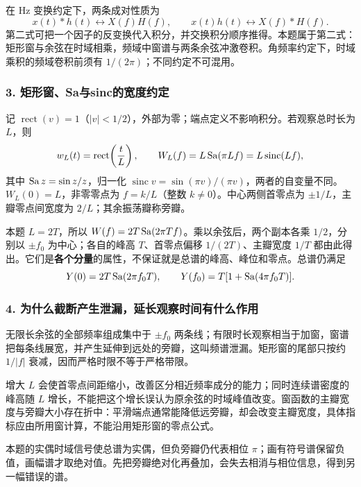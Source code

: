 在 Hz 变换约定下，两条成对性质为
\[
x(t)*h(t)\longleftrightarrow X(f)H(f),\qquad
x(t)h(t)\longleftrightarrow X(f)*H(f).
\]
第二式可把一个因子的反变换代入积分，并交换积分顺序推得。本题属于第二式：矩形窗与余弦在时域相乘，频域中窗谱与两条余弦冲激卷积。角频率约定下，时域乘积的频域卷积前须有 $1/(2\pi)$；不同约定不可混用。

\subsubsection*{3. 矩形窗、Sa与sinc的宽度约定}
记 $\operatorname{rect}(v)=1$（$|v|<1/2$），外部为零；端点定义不影响积分。若观察总时长为 $L$，则
\[
w_L(t)=\operatorname{rect}\!\left(\frac tL\right),\qquad
W_L(f)=L\operatorname{Sa}(\pi Lf)=L\operatorname{sinc}(Lf),
\]
其中 $\operatorname{Sa} z=\sin z/z$，归一化 $\operatorname{sinc}v=\sin(\pi v)/(\pi v)$，两者的自变量不同。$W_L(0)=L$，非零零点为 $f=k/L$（整数 $k\ne0$）。中心两侧首零点为 $\pm1/L$，主瓣零点间宽度为 $2/L$；其余振荡瓣称旁瓣。

本题 $L=2T$，所以 $W(f)=2T\operatorname{Sa}(2\pi Tf)$。乘以余弦后，两个副本各乘 $1/2$，分别以 $\pm f_0$ 为中心；各自的峰高 $T$、首零点偏移 $1/(2T)$、主瓣宽度 $1/T$ 都由此得出。它们是\textbf{各个分量}的属性，不保证就是总谱的峰高、峰位和零点。总谱仍满足
\[
Y(0)=2T\operatorname{Sa}(2\pi f_0T),\qquad
Y(f_0)=T[1+\operatorname{Sa}(4\pi f_0T)].
\]

\subsubsection*{4. 为什么截断产生泄漏，延长观察时间有什么作用}
无限长余弦的全部频率组成集中于 $\pm f_0$ 两条线；有限时长观察相当于加窗，窗谱把每条线展宽，并产生延伸到远处的旁瓣，这叫频谱泄漏。矩形窗的尾部只按约 $1/|f|$ 衰减，因而严格时限不等于严格带限。

增大 $L$ 会使首零点间距缩小，改善区分相近频率成分的能力；同时连续谱密度的峰高随 $L$ 增长，不能把这个增长误认为原余弦的时域峰值改变。窗函数的主瓣宽度与旁瓣大小存在折中：平滑端点通常能降低远旁瓣，却会改变主瓣宽度，具体指标应由所用窗计算，不能沿用矩形窗的零点公式。

本题的实偶时域信号使总谱为实偶，但负旁瓣仍代表相位 $\pi$；画有符号谱保留负值，画幅谱才取绝对值。先把旁瓣绝对化再叠加，会失去相消与相位信息，得到另一幅错误的谱。



